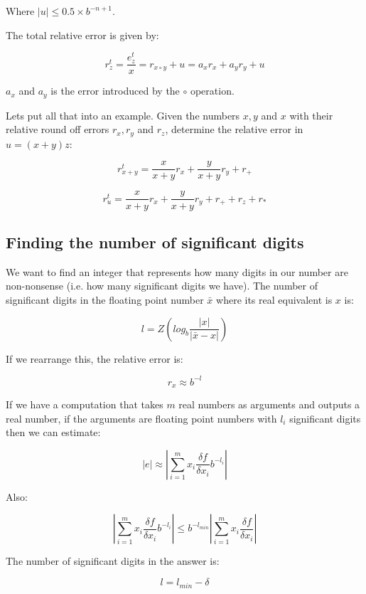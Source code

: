 Where $|u| \leq 0.5 \times b^{-n + 1}$.

The total relative error is given by:

\[
  r^t_z = \frac{e^t_z}{x} = r_{x \circ y} + u = a_xr_x + a_yr_y + u
\]

$a_x$ and $a_y$ is the error introduced by the $\circ$ operation.

Lets put all that into an example. Given the numbers $x,y$ and $x$ with their
relative round off errors $r_x, r_y$ and $r_z$, determine the relative error in
$u = (x + y)z$:

\[
  r^t_{x + y} = \frac{x}{x + y}r_x + \frac{y}{x + y}r_y + r_+
\]


\[
  r^t_{u} = \frac{x}{x + y}r_x + \frac{y}{x + y}r_y + r_+ + r_z + r_*
\]



\subsection{Finding the number of significant digits}

We want to find an integer that represents how many digits in our number are
non-nonsense (i.e. how many significant digits we have). The number of
significant digits in the floating point number $\bar{x}$ where its real
equivalent is $x$ is:


\[
  l = Z(log_b\frac{|x|}{|\bar{x} - x|})
\]

If we rearrange this, the relative error is:


\[
  r_x \approx b^{-l}
\]

If we have a computation that takes $m$ real numbers as arguments and outputs a
real number, if the arguments are floating point numbers with $l_i$ significant
digits then we can estimate:

\[
  |e| \approx |\sum^m_{i=1} x_i\frac{\delta f}{\delta x_i}b^{-l_i}|
\]

Also:

\[
  |\sum^m_{i=1} x_i\frac{\delta f}{\delta x_i}b^{-l_i}|
    \leq b^{-l_{min}}|\sum^m_{i=1} x_i\frac{\delta f}{\delta x_i}|
\]

The number of significant digits in the answer is:

\[
  l = l_{min} - \delta
\]

